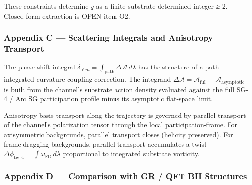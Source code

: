 \documentclass[
  11pt,
  a4paper,
]{article}
\begin{document}
These constraints determine \(g\) as a finite substrate-determined
integer ≥ 2. Closed-form extraction is OPEN item O2.

\subsubsection{Appendix C --- Scattering Integrals and Anisotropy
Transport}\label{appendix-c-scattering-integrals-and-anisotropy-transport}

The phase-shift integral
\(\delta_{\ell m} = \int_\mathrm{path}\Delta\mathcal{A}\,d\lambda\) has
the structure of a path-integrated curvature-coupling correction. The
integrand
\(\Delta\mathcal{A} = \mathcal{A}_\mathrm{full} - \mathcal{A}_\mathrm{asymptotic}\)
is built from the channel's substrate action density evaluated against
the full SG-4 / Arc SG participation profile minus its asymptotic
flat-space limit.

Anisotropy-basis transport along the trajectory is governed by parallel
transport of the channel's polarization tensor through the local
participation-frame. For axisymmetric backgrounds, parallel transport
closes (helicity preserved). For frame-dragging backgrounds, parallel
transport accumulates a twist
\(\Delta\phi_\mathrm{twist} = \int\omega_\mathrm{FD}\,d\lambda\)
proportional to integrated substrate vorticity.

\subsubsection{Appendix D --- Comparison with GR / QFT BH
Structures}\label{appendix-d-comparison-with-gr-qft-bh-structures}
\end{document}
